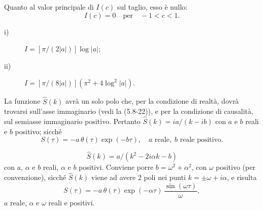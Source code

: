 \documentclass[11pt, a4paper]{book}
\numberwithin{equation}{section}
\begin{document}
\begin{description}
Quanto al valor principale di $I(c)$ sul taglio, esso è nullo:
$$I(c) = 0 \quad \text{per} \quad -1 < c < 1.$$

\item[10-7] 
\begin{description}
\item[i)] $I = \left[\pi/(2|a|)\right]\log|a|$;
\item[ii)] $I = \left[\pi/(8|a|)\right]\left(\pi^2 + 4\log^2|a|\right)$.
\end{description}

\item[11-1] La funzione $\hat{S}(k)$ avrà un solo polo che, per la condizione di realtà, dovrà trovarsi sull'asse immaginario (vedi la (5.8-22)), e per la condizione di causalità, sul semiasse immaginario positivo. Pertanto $\hat{S}(k) = ia/(k-ib)$ con $a$ e $b$ reali e $b$ positivo; sicché
$$S(\tau) = -a\,\theta(\tau)\exp(-b\tau), \quad a \text{ reale}, \; b \text{ reale positivo}.$$

\item[11-2] 
$$\hat{S}(k) = a/\left(k^2 - 2i\alpha k - b\right)$$
con $a$, $\alpha$ e $b$ reali, $\alpha$ e $b$ positivi. Conviene porre $b = \omega^2 + \alpha^2$, con $\omega$ positivo (per convenzione), sicché $\hat{S}(k)$ viene ad avere 2 poli nei punti $k = \pm\omega + i\alpha$, e risulta
$$S(\tau) = -a\,\theta(\tau)\exp(-\alpha\tau)\,\frac{\sin(\omega\tau)}{\omega},$$
$a$ reale, $\alpha$ e $\omega$ reali e positivi.

\end{description}

































    
    
    
    
    
    
\end{document}
